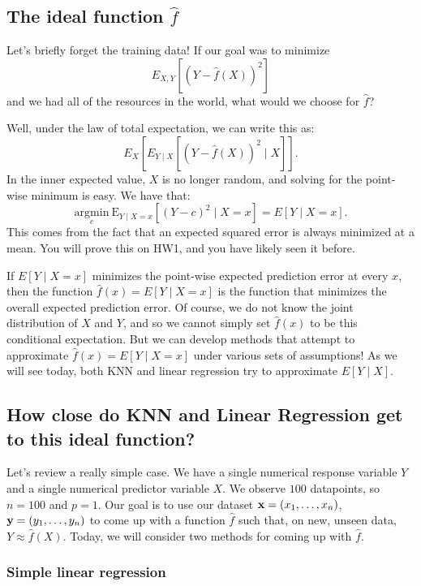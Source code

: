 \subsection{The ideal function $\hat{f}$}

Let's briefly forget the training data! If our goal was to minimize 
$$
E_{X,Y}\left[\left(Y - \hat{f}(X)\right)^2\right] 
$$
and we had all of the resources in the world, what would we choose for $\hat{f}$? 

Well, under the law of total expectation, we can write this as: 
$$
E_{X} \left[ E_{Y \mid X} \left[ (Y - \hat{f}(X))^2 \mid X \right] \right].
$$
In the inner expected value, $X$ is no longer random, and solving for the point-wise minimum is easy. We have that: 
$$
\underset{c}{\mathrm{argmin}} \  \mathrm{E}_{Y \mid X=x} \left[ (Y - c)^2 \mid X=x \right] = E[Y \mid X=x]. 
$$
This comes from the fact that an expected squared error is always minimized at a mean. You will prove this on HW1, and you have likely seen it before. 

If $E[Y \mid X=x]$ minimizes the point-wise expected prediction error at every $x$, then the function $\hat{f}(x) = E[Y \mid X=x]$ is the function that minimizes the overall expected prediction error. Of course, we do not know the joint distribution of $X$ and $Y$, and so we cannot simply set $\hat{f}(x)$ to be this conditional expectation. But we can develop methods that attempt to approximate $\hat{f}(x) = E[Y \mid X=x]$ under various sets of assumptions! As we will see today, both KNN and linear regression try to approximate $E[Y \mid X]$. 

\subsection{How close do KNN and Linear Regression get to this ideal function? }

Let's review a really simple case. We have a single numerical response variable $Y$ and a single numerical predictor variable $X$. We observe $100$ datapoints, so $n=100$ and $p=1$. Our goal is to use our dataset $\bold{x} = (x_1, \ldots, x_n)$, $\bold{y} = (y_1,\ldots,y_n)$ to come up with a function $\hat{f}$ such that, on new, unseen data, $Y \approx \hat{f}(X)$. Today, we will consider two methods for coming up with $\hat{f}$. 

\subsubsection{Simple linear regression}

